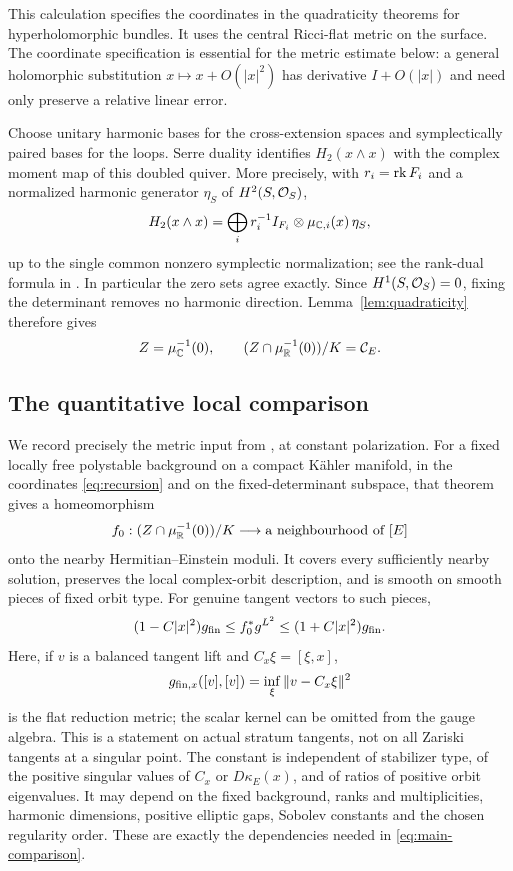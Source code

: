 This calculation specifies the coordinates in the quadraticity
theorems for hyperholomorphic bundles. It uses the central
Ricci-flat metric on the surface. The coordinate specification
is essential for the metric estimate below: a general
holomorphic substitution $x\mapsto x+O(|x|^2)$ has derivative
$I+O(|x|)$ and need only preserve a relative linear error.

Choose unitary harmonic bases for the cross-extension spaces
and symplectically paired bases for the loops. Serre duality
identifies $H_2(x\wedge x)$ with the complex moment map of this
doubled quiver. More precisely, with $r_i=\operatorname{rk} F_i$ and a
normalized harmonic generator $\eta_S$ of $H^2(S,\mathcal O_S)$,
\begin{equation}\label{eq:rank-dual}
 H_2(x\wedge x)
   =\bigoplus_i r_i^{-1}I_{F_i}\otimes
                      \mu_{\mathbb C,i}(x)\,\eta_S,
\end{equation}
up to the single common nonzero symplectic normalization;
see the rank-dual formula in \cite[Section~3]{wuebben14}.
In particular the zero sets agree exactly. Since
$H^1(S,\mathcal O_S)=0$, fixing the determinant removes no harmonic
direction. Lemma~\ref{lem:quadraticity} therefore gives
\begin{equation}\label{eq:Z-cone}
 Z=\mu_{\mathbb C}^{-1}(0),\qquad
 (Z\cap\mu_{\mathbb R}^{-1}(0))/K=\mathcal C_E.
\end{equation}

\subsection{The quantitative local comparison}
We record precisely the metric input from
\cite[Theorem~1.1(i),(iii)]{wuebben15}, at constant polarization.
For a fixed locally free polystable background on a compact
K\"ahler manifold, in the coordinates \eqref{eq:recursion} and
on the fixed-determinant subspace, that theorem gives a
homeomorphism
\[
 f_0:(Z\cap\mu_{\mathbb R}^{-1}(0))/K\longrightarrow
       \text{a neighbourhood of }[E]
\]
onto the nearby Hermitian--Einstein moduli. It covers every
sufficiently nearby solution, preserves the local complex-orbit
description, and is smooth on smooth pieces of fixed orbit type.
For genuine tangent vectors to such pieces,
\begin{equation}\label{eq:imported-estimate}
 (1-C|x|^2)g_{\rm fin}
 \le f_0^*g^{L^2}\le(1+C|x|^2)g_{\rm fin}.
\end{equation}
Here, if $v$ is a balanced tangent lift and $C_x\xi=[\xi,x]$,
\[
 g_{{\rm fin},x}([v],[v])=\inf_\xi\|v-C_x\xi\|^2
\]
is the flat reduction metric; the scalar kernel can be omitted
from the gauge algebra. This is a statement on actual stratum
tangents, not on all Zariski tangents at a singular point.
The constant is independent of stabilizer type, of the positive
singular values of $C_x$ or $D\kappa_E(x)$, and of ratios of
positive orbit eigenvalues. It may depend on the fixed
background, ranks and multiplicities, harmonic dimensions,
positive elliptic gaps, Sobolev constants and the chosen
regularity order. These are exactly the dependencies needed
in \eqref{eq:main-comparison}.

